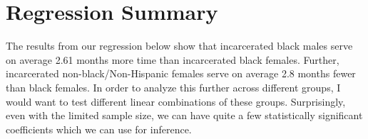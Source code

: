 \documentclass{article}
\begin{document}




\newpage

\section{Regression Summary}
The results from our regression below show that incarcerated black males serve on average 2.61 months more time than incarcerated black females. Further, incarcerated non-black/Non-Hispanic females serve on average 2.8 months fewer than black females.
In order to analyze this further across different groups, I would want to test different linear combinations of these groups. Surprisingly, even with the limited sample size, we can have quite a few statistically significant coefficients which we can use for inference.

\end{document}
